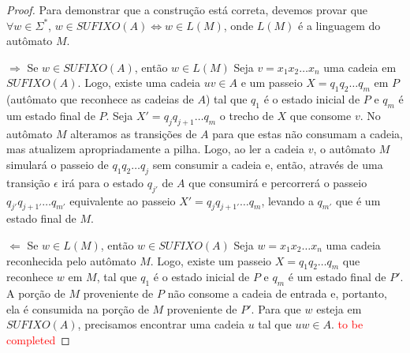 \begin{proof} Para demonstrar que a construção está correta, devemos provar que $\forall w \in \Sigma^*$, $w \in SUFIXO(A) \iff w \in L(M)$, onde $L(M)$ é a linguagem do autômato $M$.

$\Rightarrow$ Se $w \in SUFIXO(A)$, então $w \in L(M)$
Seja $v = x_1x_2 \ldots x_n$ uma cadeia em $SUFIXO(A)$. Logo, existe uma cadeia $uv \in A$ e um passeio $X = q_1q_2 \ldots q_m$ em $P$ (autômato que reconhece as cadeias de $A$) tal que $q_1$ é o estado inicial de $P$ e $q_m$ é um estado final de $P$. Seja $X' = q_jq_{j+1} \ldots q_m$ o trecho de $X$ que consome $v$. No autômato $M$ alteramos as transições de $A$ para que estas não consumam a cadeia, mas atualizem apropriadamente a pilha. Logo, ao ler a cadeia $v$, o autômato $M$ simulará o passeio de $q_1q_2 \ldots q_j$ sem consumir a cadeia e, então, através de uma transição $\epsilon$ irá para o estado $q_{j'}$ de $A$ que consumirá e percorrerá o passeio $q_{j'}q_{j+1'} \ldots q_{m'}$ equivalente ao passeio $X' = q_jq_{j+1'} \ldots q_m$, levando a $q_{m'}$ que é um estado final de $M$.

$\Leftarrow$ Se $w \in L(M)$, então $w \in SUFIXO(A)$
Seja $w = x_1x_2 \ldots x_n$ uma cadeia reconhecida pelo autômato $M$. Logo, existe um passeio $X = q_1q_2 \ldots q_m$ que reconhece $w$ em $M$, tal que $q_1$ é o estado inicial de $P$ e $q_m$ é um estado final de $P'$. A porção de $M$ proveniente de $P$ não consome a cadeia de entrada e, portanto, ela é consumida na porção de $M$ proveniente de $P'$. Para que $w$ esteja em $SUFIXO(A)$, precisamos encontrar uma cadeia $u$ tal que $uw \in A$. \textcolor{red}{to be completed}
\end{proof}